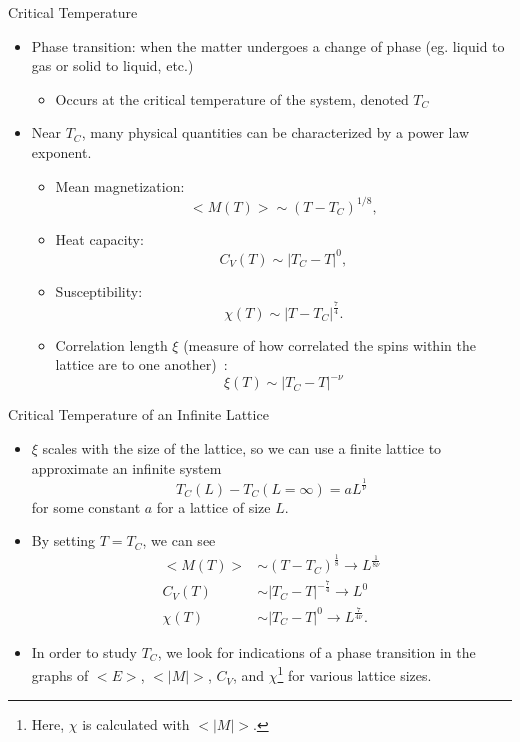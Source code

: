 \documentclass{beamer} %
\begin{document}
\begin{frame}{Critical Temperature}
\begin{itemize}
\item Phase transition: when the matter undergoes a change of phase (eg. liquid to gas or solid to liquid, etc.)
\begin{itemize}
\item Occurs at the critical temperature of the system, denoted $T_{C}$
\end{itemize}
\item Near $T_{C}$, many physical quantities can be characterized by a power law exponent.  
\begin{itemize}
\item Mean magnetization:
\begin{equation}
\label{eq:tcmag}
<M(T)>\sim(T-T_{C})^{1/8},
\end{equation}
\item Heat capacity:
\begin{equation}
\label{eq:tccv}
C_{V}(T)\sim|T_{C}-T|^{0},
\end{equation}
\item Susceptibility:
\begin{equation}
\label{eq:tcchi}
\chi(T)\sim|T-T_{C}|^{\frac{7}{4}}.
\end{equation}
\item Correlation length $\xi$ (measure of how correlated the spins within the lattice are to one another)~\cite{lecture}: 
\begin{equation}
\label{eq:tccorr}
\xi(T)\sim|T_{C}-T|^{-\nu}
\end{equation}
\end{itemize}
\end{itemize}
\end{frame}

\begin{frame}{Critical Temperature of an Infinite Lattice}
\begin{itemize}
\item $\xi$ scales with the size of the lattice, so we can use a finite lattice to approximate an infinite system
\begin{equation}
\label{eq:tcscale}
T_{C}(L)-T_{C}(L=\infty)=aL^{\frac{1}{\nu}}
\end{equation}
for some constant $a$ for a lattice of size $L$.  
\item By setting $T=T_{C}$, we can see~\cite{lecture}
\begin{align}
\label{eq:tcquants}
<M(T)> & \sim  (T-T_{C})^{\frac{1}{8}} \rightarrow  L^{\frac{1}{8\nu}} \\
C_{V}(T) & \sim  |T_{C}-T|^{-\frac{7}{4}} \rightarrow  L^{0} \\
\chi(T) & \sim  |T_{C}-T|^{0} \rightarrow L^{\frac{7}{4\nu}}. 
\end{align}
\item In order to study $T_{C}$, we look for indications of a phase transition in the graphs of $<E>$, $<|M|>$, $C_{V}$, and $\chi$\footnote{Here, $\chi$ is calculated with $<|M|>$.} for various lattice sizes.  
\end{itemize}
\end{frame}
\end{document}
